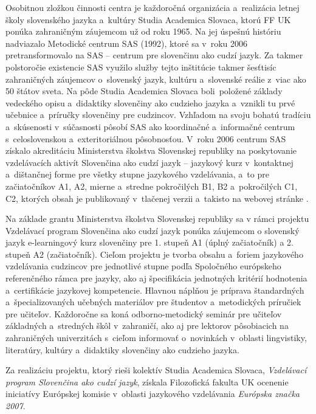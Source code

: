 \begin{multicols}{2}
Osobitnou zložkou činnosti centra je každoročná organizácia a~realizácia letnej školy slovenského jazyka a~kultúry Studia Academica Slovaca, ktorú FF UK ponúka zahraničným záujemcom už od roku 1965. Na jej úspešnú históriu nadviazalo Metodické centrum SAS (1992), ktoré sa v~roku 2006 pretransformovalo na SAS – centrum pre slovenčinu ako cudzí jazyk. Za takmer polstoročie existencie SAS využilo služby tejto inštitúcie takmer šesťtisíc zahraničných záujemcov o~slovenský jazyk, kultúru a~slovenské reálie z~viac ako 50 štátov sveta. Na pôde Studia Academica Slovaca boli~položené základy vedeckého opisu a~didaktiky slovenčiny ako cudzieho jazyka a~vznikli tu prvé učebnice a~príručky slovenčiny pre cudzincov. Vzhľadom na svoju bohatú tradíciu a~skúsenosti v~súčasnosti pôsobí SAS ako koordinačné a~informačné centrum s~celoslovenskou a~exteritoriálnou pôsobnosťou.
V~roku 2006 centrum SAS získalo akreditáciu Ministerstva školstva Slovenskej republiky na poskytovanie vzdelávacích aktivít Slovenčina ako cudzí jazyk – jazykový kurz v~kontaktnej a~dištančnej forme pre všetky stupne jazykového vzdelávania, a~to pre začiatočníkov A1, A2, mierne a~stredne pokročilých B1, B2 a~pokročilých C1, C2, ktorých obsah je publikovaný v~tlačenej verzii \cite{pekarovicova2007} a~takisto na webovej stránke \cite{f9}.

Na základe grantu Ministerstva školstva Slovenskej republiky sa v rámci projektu Vzdelávací program Slovenčina ako cudzí jazyk ponúka záujemcom o slovenský jazyk e-learningový kurz slovenčiny \cite{f33} pre 1. stupeň A1 (úplný začiatočník) a 2. stupeň A2 (začiatočník). Cieľom projektu je tvorba obsahu a~foriem jazykového vzdelávania cudzincov pre jednotlivé stupne podľa Spoločného európskeho referenčného rámca pre jazyky, ako aj špecifikácia jednotných kritérií hodnotenia a~certifikácie jazykovej kompetencie. Hlavnou náplňou je príprava štandardných a~špecializovaných učebných materiálov pre študentov a~metodických príručiek pre učiteľov. Každoročne sa koná odborno-metodický seminár pre učiteľov základných a~stredných škôl v~zahraničí, ako aj pre lektorov pôsobiacich na zahraničných univerzitách s~cieľom informovať o~novinkách v~oblasti lingvistiky, literatúry, kultúry a~didaktiky slovenčiny ako cudzieho jazyka.

Za realizáciu projektu, ktorý rieši kolektív Studia Academica Slovaca, \emph{Vzdelávací program Slovenčina ako cudzí jazyk}, získala Filozofická fakulta UK ocenenie iniciatívy Európskej komisie v~oblasti jazykového vzdelávania \emph{Európska značka 2007}.


\end{multicols}
